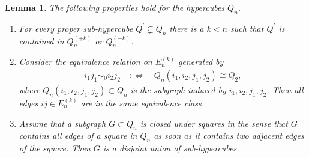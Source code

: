 \documentclass[a4paper]{amsart}
\newtheorem{lemma}[thm]{Lemma}
\begin{document}
\begin{lemma}
    \label{hyp::lemma:properties_of_hypercubes2}
    The following properties hold for the hypercubes $Q_n$.
    \begin{enumerate}
        \item For every proper sub-hypercube $Q^\prime \subsetneq Q_n$ there is a $k < n$ such that $Q^\prime$ is contained in $Q_n^{(+k)}$ or $Q_n^{(-k)}$.
        \item Consider the equivalence relation on $E_n^{(k)}$ generated by 
        \begin{align*}
            i_1j_1 \sim_0 i_2j_2
            \quad :\Leftrightarrow \quad
            Q_n(i_1, i_2, j_1, j_2) \cong Q_2,
        \end{align*}
        where $Q_n(i_1, i_2, j_1, j_2) \subset Q_n$ is the subgraph induced by $i_1, i_2, j_1, j_2$.
        Then all edges $ij \in E_n^{(k)}$ are in the same equivalence class.
        \item Assume that a subgraph $G \subset Q_n$ is closed under squares in the sense that $G$ contains all edges of a square in $Q_n$ as soon as it contains two adjacent edges of the square. Then $G$ is a disjoint union of sub-hypercubes.
    \end{enumerate}
\end{lemma}
\end{document}
